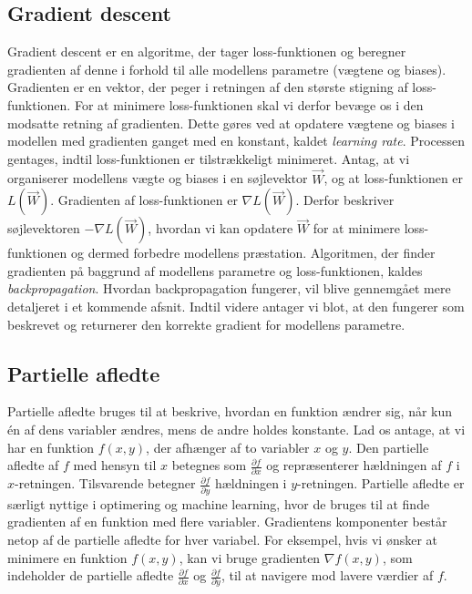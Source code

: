 \documentclass{article}
\begin{document}
\subsection{Gradient descent}
Gradient descent er en algoritme, der tager loss-funktionen og beregner gradienten af denne i forhold til alle modellens parametre (vægtene og biases). Gradienten er en vektor, der peger i retningen af den største stigning af loss-funktionen. For at minimere loss-funktionen skal vi derfor bevæge os i den modsatte retning af gradienten. Dette gøres ved at opdatere vægtene og biases i modellen med gradienten ganget med en konstant, kaldet \textit{learning rate}. Processen gentages, indtil loss-funktionen er tilstrækkeligt minimeret. \parencite{IBM_2021, Sanderson_2017, Nielsen_2019a} Antag, at vi organiserer modellens vægte og biases i en søjlevektor $\vec{W}$, og at loss-funktionen er $L(\vec{W})$. Gradienten af loss-funktionen er $\nabla L(\vec{W})$. Derfor beskriver søjlevektoren $-\nabla L(\vec{W})$, hvordan vi kan opdatere $\vec{W}$ for at minimere loss-funktionen og dermed forbedre modellens præstation. Algoritmen, der finder gradienten på baggrund af modellens parametre og loss-funktionen, kaldes \textit{backpropagation}. \parencite{Sanderson_2017, Nielsen_2019a} Hvordan backpropagation fungerer, vil blive gennemgået mere detaljeret i et kommende afsnit. Indtil videre antager vi blot, at den fungerer som beskrevet og returnerer den korrekte gradient for modellens parametre.

\subsection{Partielle afledte}
Partielle afledte bruges til at beskrive, hvordan en funktion ændrer sig, når kun én af dens variabler ændres, mens de andre holdes konstante. Lad os antage, at vi har en funktion $f(x, y)$, der afhænger af to variabler $x$ og $y$. Den partielle afledte af $f$ med hensyn til $x$ betegnes som $\frac{\partial f}{\partial x}$ og repræsenterer hældningen af $f$ i $x$-retningen. Tilsvarende betegner $\frac{\partial f}{\partial y}$ hældningen i $y$-retningen. Partielle afledte er særligt nyttige i optimering og machine learning, hvor de bruges til at finde gradienten af en funktion med flere variabler. Gradientens komponenter består netop af de partielle afledte for hver variabel. For eksempel, hvis vi ønsker at minimere en funktion $f(x, y)$, kan vi bruge gradienten $\nabla f(x, y)$, som indeholder de partielle afledte $\frac{\partial f}{\partial x}$ og $\frac{\partial f}{\partial y}$, til at navigere mod lavere værdier af $f$. \parencite{Kirsanov_2024}
\end{document}
